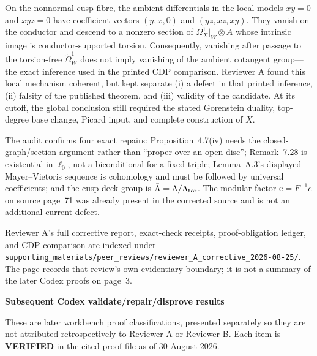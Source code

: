 {\ResultSmall
On the nonnormal cusp fibre, the ambient differentials in the local models
$xy=0$ and $xyz=0$ have coefficient vectors $(y,x,0)$ and $(yz,xz,xy)$.
They vanish on the conductor and descend to a nonzero section of
$\Omega_X^1|_W\otimes A$ whose intrinsic image is conductor-supported
torsion.  Consequently, vanishing after passage to the torsion-free
$\widetilde\Omega_W^1$ does not imply vanishing of the ambient cotangent
group---the exact inference used in the printed CDP comparison.  Reviewer A
found this local mechanism coherent, but kept separate (i) a defect in that
printed inference, (ii) falsity of the published theorem, and (iii) validity
of the candidate.  At its cutoff, the global conclusion still required the
stated Gorenstein duality, top-degree base change, Picard input, and complete
construction of $X$.
}

{\ResultSmall
The audit confirms four exact repairs: Proposition~4.7(iv) needs the
closed-graph/section argument rather than ``proper over an open disc'';
Remark~7.28 is existential in $\ell_0$, not a biconditional for a fixed
triple; Lemma~A.3's displayed Mayer--Vietoris sequence is cohomology and
must be followed by universal coefficients; and the cusp deck group is
$\bar\Lambda=\Lambda/\Lambda_{\rm tor}$.  The modular factor
$\mathsf e=F^{-1}e$ on source page~71 was already present in the corrected
source and is not an additional current defect.
}

\vfill
{\fontsize{6.7pt}{7.7pt}\selectfont\color{AuditProvenance}
Reviewer A's full corrective report, exact-check receipts, proof-obligation
ledger, and CDP comparison are indexed under
\nolinkurl{supporting_materials/peer_reviews/reviewer_A_corrective_2026-08-25/}.
The page records that review's own evidentiary boundary; it is not a summary
of the later Codex proofs on page~3.}
\endgroup

\newpage
\thispagestyle{empty}
\begingroup
\raggedright
\setlength{\parindent}{0pt}
\setlength{\parskip}{0pt}
\setlength{\fboxsep}{5pt}
\newcommand{\ResultHead}[1]{\par\vspace{2.1pt}{\fontsize{8.25pt}{9.05pt}\selectfont\bfseries\color{AuditReviewed}#1}\par\vspace{0.7pt}}
\newcommand{\ResultSmall}{\fontsize{7.12pt}{8.12pt}\selectfont}

{\fontsize{15.2pt}{16.6pt}\selectfont\bfseries Subsequent Codex validate/repair/disprove results}
\par\vspace{1pt}
{\fontsize{7.1pt}{8.1pt}\selectfont\color{AuditProvenance}
These are later workbench proof classifications, presented separately so
they are not attributed retrospectively to Reviewer A or Reviewer B.  Each
item is \textbf{VERIFIED} in the cited proof file as of 30 August 2026.}

